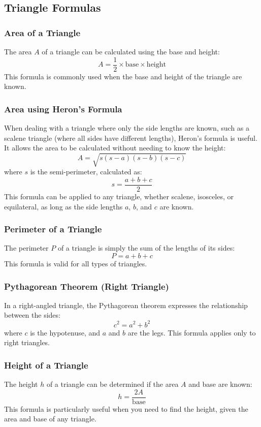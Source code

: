 \subsection{Triangle Formulas}

\subsubsection{Area of a Triangle}

The area \( A \) of a triangle can be calculated using the base and height:
\[
A = \frac{1}{2} \times \text{base} \times \text{height}
\]
This formula is commonly used when the base and height of the triangle are known.

\subsubsection{Area using Heron’s Formula}

When dealing with a triangle where only the side lengths are known, such as a scalene triangle (where all sides have different lengths), Heron’s formula is useful. It allows the area to be calculated without needing to know the height:
\[
A = \sqrt{s(s-a)(s-b)(s-c)}
\]
where \( s \) is the semi-perimeter, calculated as:
\[
s = \frac{a + b + c}{2}
\]
This formula can be applied to any triangle, whether scalene, isosceles, or equilateral, as long as the side lengths \( a \), \( b \), and \( c \) are known.

\subsubsection{Perimeter of a Triangle}

The perimeter \( P \) of a triangle is simply the sum of the lengths of its sides:
\[
P = a + b + c
\]
This formula is valid for all types of triangles.

\subsubsection{Pythagorean Theorem (Right Triangle)}

In a right-angled triangle, the Pythagorean theorem expresses the relationship between the sides:
\[
c^2 = a^2 + b^2
\]
where \( c \) is the hypotenuse, and \( a \) and \( b \) are the legs. This formula applies only to right triangles.

\subsubsection{Height of a Triangle}

The height \( h \) of a triangle can be determined if the area \( A \) and base are known:
\[
h = \frac{2A}{\text{base}}
\]
This formula is particularly useful when you need to find the height, given the area and base of any triangle.

